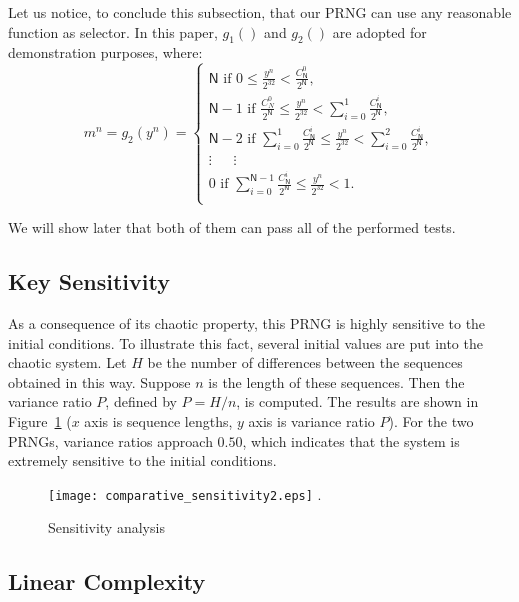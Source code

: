 \documentclass[journal]{IEEEtran}
\begin{document}
Let us notice, to conclude this subsection, that our PRNG can use any reasonable function as selector. In this paper, $g_1()$ and $g_2()$ are adopted for demonstration purposes, where:
\begin{equation}
m^n = g_2(y^n)=
\left\{
\begin{array}{l}
\mathsf{N} \text{ if }0 \leqslant\frac{y^n}{2^{32}}<\frac{C^0_\mathsf{N}}{2^\mathsf{N}},\\
\mathsf{N}-1 \text{ if }\frac{C^0_N}{2^\mathsf{N}} \leqslant\frac{y^n}{2^{32}}<\sum_{i=0}^1\frac{C^i_\mathsf{N}}{2^\mathsf{N}},\\
\mathsf{N}-2 \text{ if }\sum_{i=0}^1\frac{C^i_\mathsf{N}}{2^\mathsf{N}} \leqslant\frac{y^n}{2^{32}}<\sum_{i=0}^2\frac{C^i_\mathsf{N}}{2^\mathsf{N}},\\
\vdots~~~~~ ~~\vdots~~~ ~~~~\\
0 \text{ if }\sum_{i=0}^{\mathsf{N}-1}\frac{C^i_\mathsf{N}}{2^\mathsf{N}} \leqslant\frac{y^n}{2^{32}}<1.\\
\end{array}
\right.
\end{equation}

We will show later that both of them can pass all of the performed tests. 



\subsection{Key Sensitivity}
As a consequence of its chaotic property, this PRNG is highly sensitive to the initial conditions. To illustrate this fact, several initial values are put into the chaotic system. Let $H$ be the number
of differences between the sequences obtained in this way. Suppose $n$ is the length of these
sequences. Then the variance ratio $P$, defined by $P = H / n$, is computed. The results are
shown in Figure~\ref{Sensitivity analysis} ($x$ axis is sequence lengths, $y$ axis is variance ratio $P$). For the two PRNGs, variance
ratios approach $0.50$, which indicates that the system is extremely sensitive to the initial
conditions.

\begin{figure}
\centering
\texttt{[image: comparative\_sensitivity2.eps]}
\DeclareGraphicsExtensions.
\caption{Sensitivity analysis}
\label{Sensitivity analysis}
\end{figure}



\subsection{Linear Complexity}
\end{document}
